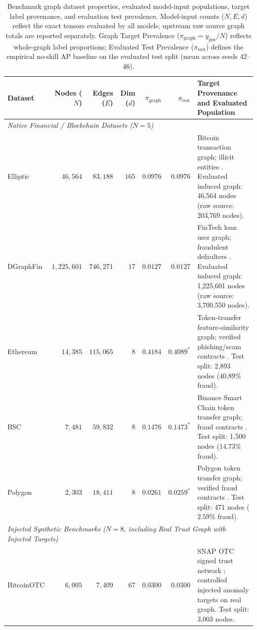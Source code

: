 \documentclass[applsci,article,submit,moreauthors,pdftex]{Definitions/mdpi}
\begin{document}
\begin{table}[htbp]
\centering\fontsize{7.5pt}{8.8pt}\selectfont\setlength{\tabcolsep}{2.5pt}
\caption{Benchmark graph dataset properties, evaluated model-input populations, target label provenance, and evaluation test prevalence. Model-input counts ($N, E, d$) reflect the exact tensors evaluated by all models; upstream raw source graph totals are reported separately. Graph Target Prevalence ($\pi_{\mathrm{graph}} = y_{\mathrm{pos}} / N$) reflects whole-graph label proportions; Evaluated Test Prevalence ($\pi_{\mathrm{test}}$) defines the empirical no-skill AP baseline on the evaluated test split (mean across seeds 42--46).}
\label{tab:dataset_properties}
\begin{tabularx}{\textwidth}{lrrrrr>{\raggedright\arraybackslash}X}\toprule
\textbf{Dataset} & \textbf{Nodes ($N$)} & \textbf{Edges ($E$)} & \textbf{Dim ($d$)} & $\pi_{\mathrm{graph}}$ & $\pi_{\mathrm{test}}$ & \textbf{Target Provenance and Evaluated Population} \\\midrule
\multicolumn{7}{l}{\textit{Native Financial / Blockchain Datasets ($N=5$)}} \\
Elliptic & $46,564$ & $83,188$ & $165$ & $0.0976$ & $0.0976$ & Bitcoin transaction graph; illicit entities \cite{weber2019elliptic}. Evaluated induced graph: 46,564 nodes (raw source: 203,769 nodes). \\
DGraphFin & $1,225,601$ & $746,271$ & $17$ & $0.0127$ & $0.0127$ & FinTech loan user graph; fraudulent defaulters \cite{huang2022dgraph}. Evaluated induced graph: 1,225,601 nodes (raw source: 3,700,550 nodes). \\
Ethereum & $14,385$ & $115,065$ & $8$ & $0.4184$ & $0.4089^*$ & Token-transfer feature-similarity graph; verified phishing/scam contracts \cite{luo2024multichain}. Test split: 2,893 nodes ($40.89\%$ fraud). \\
BSC & $7,481$ & $59,832$ & $8$ & $0.1476$ & $0.1473^*$ & Binance Smart Chain token transfer graph; fraud contracts \cite{luo2024multichain}. Test split: 1,500 nodes ($14.73\%$ fraud). \\
Polygon & $2,303$ & $18,411$ & $8$ & $0.0261$ & $0.0259^*$ & Polygon token transfer graph; verified fraud contracts \cite{luo2024multichain}. Test split: 471 nodes ($2.59\%$ fraud). \\
\midrule
\multicolumn{7}{l}{\textit{Injected Synthetic Benchmarks ($N=8$, including Real Trust Graph with Injected Targets)}} \\
BitcoinOTC & $6,005$ & $7,409$ & $67$ & $0.0300$ & $0.0300$ & SNAP OTC signed trust network \cite{kumar2016edge,snapbitcoinotc}; controlled injected anomaly targets on real graph. Test split: 3,003 nodes. \\

\end{tabularx}
\end{table}
\end{document}
